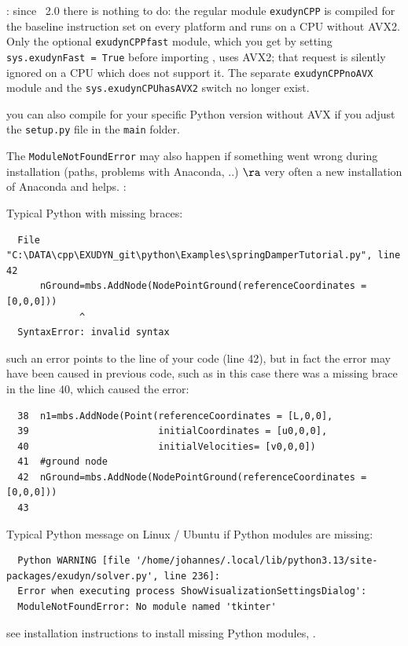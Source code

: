 \item[$\ra$] : since \codeName\ 2.0 there is nothing to do: the regular module \texttt{exudynCPP} is compiled for the baseline instruction set on every platform and runs on a CPU without AVX2. Only the optional \texttt{exudynCPPfast} module, which you get by setting \texttt{sys.exudynFast = True} before importing \codeName, uses AVX2; that request is silently ignored on a CPU which does not support it. The separate \texttt{exudynCPPnoAVX} module and the \texttt{sys.exudynCPUhasAVX2} switch no longer exist.
\item[$\ra$] you can also compile for your specific Python version without AVX if you adjust the \texttt{setup.py} file in the \texttt{main} folder.
\item[$\ra$] The \texttt{ModuleNotFoundError} may also happen if something went wrong during installation (paths, problems with Anaconda, ..) $\ra$ very often a new installation of Anaconda and \codeName helps.
\ei
\ei
\noindent {}:
\bi
  \item Typical Python  with missing braces:
\plainlststyle
\begin{lstlisting}
  File "C:\DATA\cpp\EXUDYN_git\python\Examples\springDamperTutorial.py", line 42
      nGround=mbs.AddNode(NodePointGround(referenceCoordinates = [0,0,0]))
             ^
  SyntaxError: invalid syntax
\end{lstlisting}
\onlyRST{\rstStartNewLine}
%
\item[$\ra$] such an error points to the line of your code (line 42), but in fact the error may have been caused in previous code, such as in this case there was a missing brace in the line 40, which caused the error:
\pythonstyle\begin{lstlisting}
  38  n1=mbs.AddNode(Point(referenceCoordinates = [L,0,0],
  39                       initialCoordinates = [u0,0,0],
  40                       initialVelocities= [v0,0,0])
  41  #ground node
  42  nGround=mbs.AddNode(NodePointGround(referenceCoordinates = [0,0,0]))
  43  
\end{lstlisting}
%
%
\item Typical Python  message on Linux / Ubuntu if Python modules are missing:
\plainlststyle
\begin{lstlisting}
  Python WARNING [file '/home/johannes/.local/lib/python3.13/site-packages/exudyn/solver.py', line 236]: 
  Error when executing process ShowVisualizationSettingsDialog':
  ModuleNotFoundError: No module named 'tkinter'
\end{lstlisting}
\onlyRST{\rstStartNewLine}
%
\item[$\ra$] see installation instructions to install missing Python modules, .

